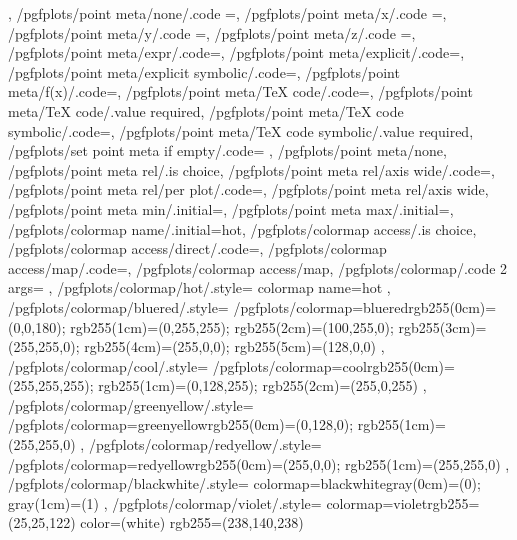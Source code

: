 {{	},%
	/pgfplots/point meta/none/.code	={},%
	/pgfplots/point meta/x/.code	={},%
	/pgfplots/point meta/y/.code	={},%
	/pgfplots/point meta/z/.code	={},%
	/pgfplots/point meta/expr/.code={},%
	/pgfplots/point meta/explicit/.code={},%
	/pgfplots/point meta/explicit symbolic/.code={},%
	/pgfplots/point meta/f(x)/.code={},%
	/pgfplots/point meta/TeX code/.code={},%
	/pgfplots/point meta/TeX code/.value required,
	/pgfplots/point meta/TeX code symbolic/.code={},%
	/pgfplots/point meta/TeX code symbolic/.value required,
	/pgfplots/set point meta if empty/.code={%
		\ifx\pgfplotspointmetainputhandler\pgfutil@empty
		\fi
	},%
	/pgfplots/point meta/none,
	/pgfplots/point meta rel/.is choice,
	/pgfplots/point meta rel/axis wide/.code={\def\pgfplots@perpointmeta@rel@choice{0}},%
	/pgfplots/point meta rel/per plot/.code={\def\pgfplots@perpointmeta@rel@choice{1}},%
	/pgfplots/point meta rel/axis wide,%
	/pgfplots/point meta min/.initial=,%
	/pgfplots/point meta max/.initial=,%
	/pgfplots/colormap name/.initial=hot,
	/pgfplots/colormap access/.is choice,
	/pgfplots/colormap access/direct/.code={\def\pgfplots@colormap@access{d}},%
	/pgfplots/colormap access/map/.code={\def\pgfplots@colormap@access{m}},%
	/pgfplots/colormap access/map,%
	/pgfplots/colormap/.code 2 args={%
	},
	/pgfplots/colormap/hot/.style={
		colormap name=hot
	},
	/pgfplots/colormap/bluered/.style={
		/pgfplots/colormap={bluered}{rgb255(0cm)=(0,0,180); rgb255(1cm)=(0,255,255); rgb255(2cm)=(100,255,0); rgb255(3cm)=(255,255,0); rgb255(4cm)=(255,0,0); rgb255(5cm)=(128,0,0)}
	},
	/pgfplots/colormap/cool/.style={
		/pgfplots/colormap={cool}{rgb255(0cm)=(255,255,255); rgb255(1cm)=(0,128,255); rgb255(2cm)=(255,0,255)}
	},
	/pgfplots/colormap/greenyellow/.style={
		/pgfplots/colormap={greenyellow}{rgb255(0cm)=(0,128,0); rgb255(1cm)=(255,255,0)}
	},
	/pgfplots/colormap/redyellow/.style={
		/pgfplots/colormap={redyellow}{rgb255(0cm)=(255,0,0); rgb255(1cm)=(255,255,0)}
	},
	/pgfplots/colormap/blackwhite/.style={
		colormap={blackwhite}{gray(0cm)=(0); gray(1cm)=(1)}
	},
	/pgfplots/colormap/violet/.style={
		colormap={violet}{rgb255=(25,25,122) color=(white) rgb255=(238,140,238)}
}}
